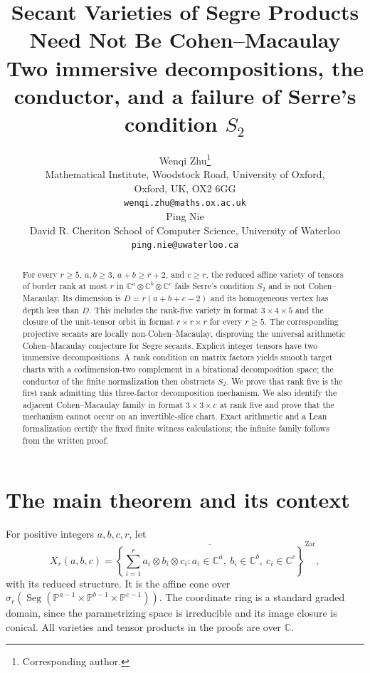 \documentclass[10pt,a4paper]{article}
\title{Secant Varieties of Segre Products Need Not Be Cohen--Macaulay\\[2pt]\large Two immersive decompositions, the conductor, and a failure of Serre's condition $S_2$}
\author{%
Wenqi Zhu\thanks{Corresponding author.}\\
{\small Mathematical Institute, Woodstock Road, University of Oxford,}\\
{\small Oxford, UK, OX2 6GG}\\
{\small\texttt{wenqi.zhu@maths.ox.ac.uk}}\\[1ex]
Ping Nie\\
{\small David R. Cheriton School of Computer Science, University of Waterloo}\\
{\small\texttt{ping.nie@uwaterloo.ca}}}
\date{}
\theoremstyle{definition}
\theoremstyle{remark}
\numberwithin{equation}{section}
\newcommand{\C}{\mathbb C}
\newcommand{\PP}{\mathbb P}
\DeclareMathOperator{\Seg}{Seg}
\begin{document}
\maketitle
\begin{abstract}
For every $r\geq5$, $a,b\geq3$, $a+b\geq r+2$, and $c\geq r$,
the reduced affine variety of tensors of border rank at most $r$ in
$\C^a\otimes\C^b\otimes\C^c$ fails Serre's condition $S_2$ and is
not Cohen--Macaulay. Its dimension is $D=r(a+b+c-2)$ and its
homogeneous vertex has depth less than $D$. This includes the
rank-five variety in format $3\times4\times5$ and the closure of
the unit-tensor orbit in format $r\times r\times r$ for every
$r\geq5$. The corresponding projective secants are locally
non-Cohen--Macaulay, disproving the universal arithmetic
Cohen--Macaulay conjecture for Segre secants.
Explicit integer tensors have two immersive decompositions.
A rank condition on matrix factors yields smooth target charts with
a codimension-two complement in a birational decomposition space;
the conductor of the finite normalization then obstructs $S_2$.
We prove that rank five is the first rank admitting this
three-factor decomposition mechanism. We also identify the adjacent
Cohen--Macaulay family in format $3\times3\times c$ at rank five
and prove that the mechanism cannot occur on an invertible-slice
chart. Exact arithmetic and a Lean formalization certify the fixed
finite witness calculations; the infinite family follows from the
written proof.
\end{abstract}

\section{The main theorem and its context}\label{sec:introduction}

For positive integers $a,b,c,r$, let
\begin{equation}\label{eq:general-secant}
 X_r(a,b,c)=
 \overline{\left\{\sum_{i=1}^r a_i\otimes b_i\otimes c_i:
    a_i\in\C^a,\ b_i\in\C^b,\ c_i\in\C^c\right\}}^{\mathrm{Zar}},
\end{equation}
with its reduced structure. It is the affine cone over
$\sigma_r(\Seg(\PP^{a-1}\times\PP^{b-1}\times\PP^{c-1}))$.
The coordinate ring is a standard graded domain, since the
parametrizing space is irreducible and its image closure is conical.
All varieties and tensor products in the proofs are over $\C$.
\end{document}
